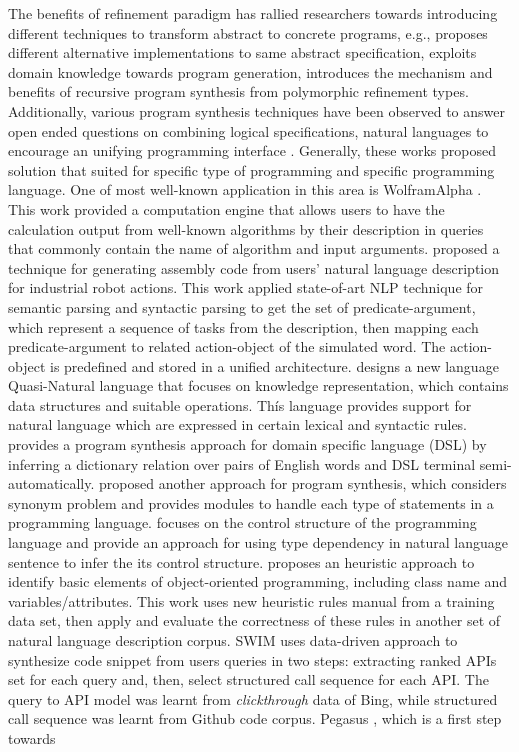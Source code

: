 \documentclass[11pt]{article}
\begin{document}
The benefits of refinement paradigm has rallied researchers towards introducing different techniques to transform abstract to concrete programs, e.g., \cite{Barstow:1978} proposes different alternative implementations to same abstract specification, \cite{Goncalves:2016} exploits domain knowledge towards program generation, \cite{Polikarpova:2016} introduces the mechanism and benefits of recursive program synthesis from polymorphic refinement types. Additionally, various program synthesis techniques \cite{WolframAlpha, Nazlia:2008, Maj:2014, Yin:2010, Butler:2017, Landhauber:2015, Desai:2016, Sharvari:2016, Raghothaman:2016, Yaghmazadeh:2017, Liu:2005, Knoll:2006} have been observed to answer open ended questions on combining logical specifications, natural languages to encourage an unifying programming interface \cite{Gulwani:2010}. Generally, these works proposed solution that suited for specific type of programming and specific programming language. One of most well-known application in this area is WolframAlpha \cite{WolframAlpha}. This work provided a computation engine that allows users to have the calculation output from well-known algorithms by their description in queries that commonly contain the name of algorithm and input arguments. \cite{Maj:2014} proposed a technique for generating assembly code from users’ natural language description for industrial robot actions. This work applied state-of-art NLP technique for semantic parsing and syntactic parsing to get the set of predicate-argument, which represent a sequence of tasks from the description, then mapping each predicate-argument to related action-object of the simulated word. The action-object is predefined and stored in a unified architecture. \cite{Yin:2010} designs a new language Quasi-Natural language that focuses on knowledge representation, which contains data structures and suitable operations. Thís language provides support for natural language which are expressed in certain lexical and syntactic rules. \cite{Desai:2017} provides a program synthesis approach for domain specific language (DSL)  by inferring a dictionary relation over pairs of English words and DSL terminal semi-automatically. \cite{Sharvari:2016} proposed another approach for program synthesis, which considers synonym problem and provides modules to handle each type of statements in a programming language. \cite{Landhauber:2015} focuses on the control structure of the programming language and provide an approach for using type dependency in natural language sentence to infer the its control structure. \cite{Nazlia:2008} proposes an heuristic approach to identify basic elements of object-oriented programming, including class name and variables/attributes. This work uses new heuristic rules manual from a training data set, then apply and evaluate the correctness of these rules in another set of natural language description corpus. SWIM \cite{Raghothaman:2016} uses data-driven approach to synthesize code snippet from users queries in two steps: extracting ranked APIs set for each query and, then, select structured call sequence for each API. The query to API model was learnt from \emph{clickthrough} data of Bing, while structured call sequence was learnt from Github code corpus. Pegasus \cite{Knoll:2006}, which is a first step towards 
\end{document}
